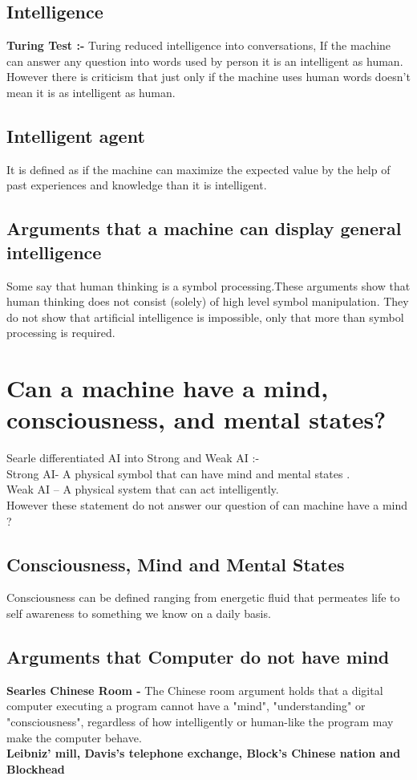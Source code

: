 \documentclass[a4paper,10pt]{article}
\begin{document}
\subsection{Intelligence} 
\textbf {Turing Test :-}
Turing reduced  intelligence into conversations, If the machine can answer any question into words used by person it is an intelligent as human. However there is criticism that just only if the machine uses human words doesn’t mean it is as intelligent as human. 
\subsection{Intelligent agent}
It is defined as if the machine can maximize the expected value by the help of past experiences and knowledge than it is intelligent.
\subsection{Arguments that a machine can display general intelligence}
Some say that human thinking is a symbol processing.These arguments show that human thinking does not consist (solely) of high level symbol manipulation. They do not show that artificial intelligence is impossible, only that more than symbol processing is required.\\
\section{Can a machine have a mind, consciousness, and mental states?}
Searle differentiated AI into Strong and Weak AI :- \\ 
Strong AI- A physical symbol that can have mind and mental states .\\
Weak AI – A physical system that can act intelligently. \\
However these statement do not answer our question of can machine have a mind ? \\
\subsection{Consciousness, Mind and Mental States }
Consciousness can be defined ranging from  energetic fluid that permeates life to self awareness to something we know on a daily basis. \\
\subsection{Arguments that Computer do not have mind }
\textbf {Searles Chinese Room - }The Chinese room argument holds that a digital computer executing a program cannot have a "mind", "understanding" or "consciousness", regardless of how intelligently or human-like the program may make the computer behave.\\
 \textbf {Leibniz' mill, Davis's telephone exchange, Block's Chinese nation and Blockhead} \\
\end{document}
